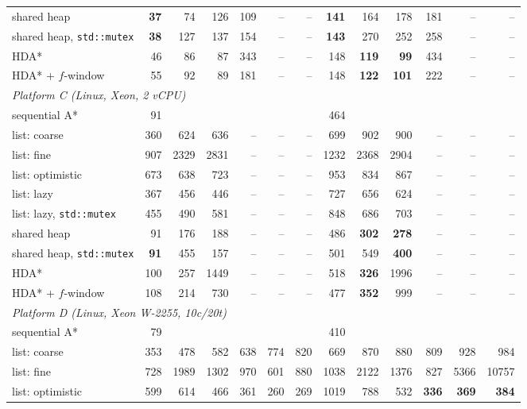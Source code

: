 \begin{tabular}{lrrrrrrrrrrrr}
shared heap & \textbf{37} & 74 & 126 & 109 & -- & -- & \textbf{141} & 164 & 178 & 181 & -- & -- \\
shared heap, \texttt{std::mutex} & \textbf{38} & 127 & 137 & 154 & -- & -- & \textbf{143} & 270 & 252 & 258 & -- & -- \\
HDA* & 46 & 86 & 87 & 343 & -- & -- & 148 & \textbf{119} & \textbf{99} & 434 & -- & -- \\
HDA* + $f$-window & 55 & 92 & 89 & 181 & -- & -- & 148 & \textbf{122} & \textbf{101} & 222 & -- & -- \\
\midrule
\multicolumn{13}{l}{\emph{Platform C (Linux, Xeon, 2 vCPU)}} \\
sequential A* & 91 &  &  &  &  &  & 464 &  &  &  &  &  \\
list: coarse & 360 & 624 & 636 & -- & -- & -- & 699 & 902 & 900 & -- & -- & -- \\
list: fine & 907 & 2329 & 2831 & -- & -- & -- & 1232 & 2368 & 2904 & -- & -- & -- \\
list: optimistic & 673 & 638 & 723 & -- & -- & -- & 953 & 834 & 867 & -- & -- & -- \\
list: lazy & 367 & 456 & 446 & -- & -- & -- & 727 & 656 & 624 & -- & -- & -- \\
list: lazy, \texttt{std::mutex} & 455 & 490 & 581 & -- & -- & -- & 848 & 686 & 703 & -- & -- & -- \\
shared heap & 91 & 176 & 188 & -- & -- & -- & 486 & \textbf{302} & \textbf{278} & -- & -- & -- \\
shared heap, \texttt{std::mutex} & \textbf{91} & 455 & 157 & -- & -- & -- & 501 & 549 & \textbf{400} & -- & -- & -- \\
HDA* & 100 & 257 & 1449 & -- & -- & -- & 518 & \textbf{326} & 1996 & -- & -- & -- \\
HDA* + $f$-window & 108 & 214 & 730 & -- & -- & -- & 477 & \textbf{352} & 999 & -- & -- & -- \\
\midrule
\multicolumn{13}{l}{\emph{Platform D (Linux, Xeon W-2255, 10c/20t)}} \\
sequential A* & 79 &  &  &  &  &  & 410 &  &  &  &  &  \\
list: coarse & 353 & 478 & 582 & 638 & 774 & 820 & 669 & 870 & 880 & 809 & 928 & 984 \\
list: fine & 728 & 1989 & 1302 & 970 & 601 & 880 & 1038 & 2122 & 1376 & 827 & 5366 & 10757 \\
list: optimistic & 599 & 614 & 466 & 361 & 260 & 269 & 1019 & 788 & 532 & \textbf{336} & \textbf{369} & \textbf{384} \\

\end{tabular}
